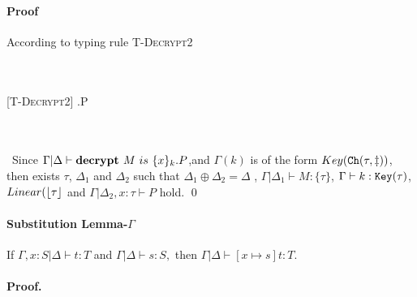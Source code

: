 \documentclass[master,english]{kuisthesis}
\theoremstyle{definition}
\begin{document}
\paragraph{Proof}  According to typing rule \textsc{T-Decrypt2}
\ \\ \ \\ \ 
\begin{center}
\begin{prooftree}
[\textsc{T-Decrypt2}]{
 \vdash {}.P
}
\end{prooftree}
\end{center}
\ \\ \ \\ \ 
Since  $\Gamma |\Delta \vdash \textbf{decrypt }{M}~is~\{{x}\}_{k}.P$,and $\Gamma (k)$ is of the form $Key({\tt Ch}({\tau, \ddagger})) $, then exists $\tau$, $\Delta_1$ and $\Delta_2 $ such that $\Delta_1 \oplus \Delta_2 =\Delta $ ,   $\Gamma|\Delta_1 \vdash M : \{\tau\}$, $\Gamma \vdash k : {\tt Key}({\tau})$, $ Linear(\lfloor {\tau} \rfloor$ and  $\Gamma | \Delta_2, x:\tau  \vdash P $ hold.
\qed

\paragraph{Substitution Lemma-$\Gamma$} If  $ \Gamma, x:S | \Delta \vdash t : T $ and $ \Gamma | \Delta \vdash  s:S,$  then $ \Gamma| \Delta \vdash [x \mapsto s ]t :T.  $
\paragraph{Proof.}
\end{document}
